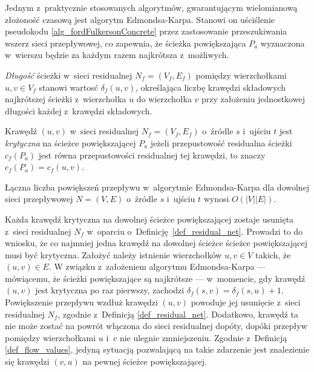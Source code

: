 \par{
  Jednym z~praktycznie stosowanych algorytmów, gwarantującym wielomianową złożoność czasową jest algorytm Edmondsa-Karpa.
  Stanowi on uściślenie pseudokodu \ref{alg_fordFulkersonConcrete} przez zastosowanie przeszukiwania wszerz sieci przepływowej, co zapewnia, że ścieżka powiększająca $P_a$ wyznaczona w~wierszu  będzie za każdym razem najkrótsza z~możliwych.
  \begin{definition}
    \emph{Długość} ścieżki w~sieci residualnej $N_f=(V_f, E_f)$ pomiędzy wierzchołkami $u, v \in V_f$ stanowi wartosć $\delta_f(u, v)$, określająca liczbę krawędzi składowych najkrótszej ścieżki z~wierzchołka $u$ do wierzchołka $v$ przy założeniu jednostkowej długości każdej z~krawędzi składowych.
  \end{definition}
  \begin{definition}
    Krawędź $(u, v)$ w~sieci residualnej $N_f=(V_f, E_f)$ o~źródle $s$ i~ujściu $t$ jest \emph{krytyczna} na ścieżce powiększającej $P_a$ jeżeli przepustowość residualna ścieżki $c_f(P_a)$ jest równa przepustowości residualnej tej krawędzi, to znaczy $c_f(P_a)=c_f(u, v)$.
  \end{definition}
  \begin{theorem}
    Łączna liczba powiększeń przepływu w~algorytmie Edmondsa-Karpa dla dowolnej sieci przepływowej $N=(V, E)$ o~źródle $s$ i~ujściu $t$ wynosi $O(|V||E|)$.
  \end{theorem}
  \begin{bproof}
    Każda krawędź krytyczna na dowolnej ścieżce powiększającej zostaje usunięta z~sieci residualnej $N_f$ w~oparciu o~Definicję~\ref{def_residual_net}.
    Prowadzi to do wniosku, że co najmniej jedna krawędź na dowolnej ścieżce ścieżce powiększającej musi być krytyczna.
    Założyć należy istnienie wierzchołków $u, v \in V$ takich, że $(u, v) \in E$.
    W związku z~założeniem algorytmu Edmondsa-Karpa --- mówiącemu, że ścieżki powiększające są najkrótsze --- w~momencie, gdy krawędź $(u, v)$ jest krytyczna po raz pierwszy, zachodzi $\delta_f(s, v)=\delta_f(s, u)+1$.
    Powiększenie przepływu wzdłuż krawędzi $(u, v)$ powoduje jej usunięcie z~sieci residualnej $N_f$, zgodnie z~Definicją \ref{def_residual_net}.
    Dodatkowo, krawędź ta nie może zostać na powrót włączona do sieci residualnej dopóty, dopóki przepływ pomiędzy wierzchołkami $u$ i~$v$ nie ulegnie zmniejszeniu.
    Zgodnie z~Definicją \ref{def_flow_values}, jedyną sytuacją pozwalającą na takie zdarzenie jest znalezienie się krawędzi $(v, u)$ na pewnej ścieżce powiększającej.

\end{bproof}}
